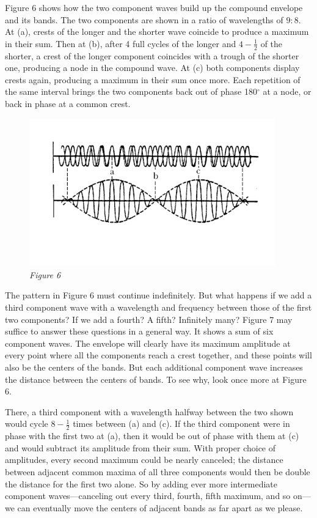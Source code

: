 Figure 6 shows how the two component waves build up the compound
envelope and its bands. The two components are shown in a ratio of
wavelengths of $9:8$. At (a), crests of the longer and the shorter wave
coincide to produce a maximum in their sum. Then at (b), after 4 full
cycles of the longer and $4-\frac{1}{2}$ of the shorter, a crest of the longer
component coincides with a trough of the shorter one, producing a node
in the compound wave. At (c) both components display crests again,
producing a maximum in their sum once more. Each repetition of the same
interval brings the two components back out of phase 180$^{\circ}$ at a node, or
back in phase at a common crest.

\begin{figure}[h] %
\centering
    \includegraphics[width=4.18333in,height=2.51667in]{images/08_debroglie/image039.png}
    \vspace{-3em}
    \caption*{\emph{Figure 6}}
\end{figure}

The pattern in Figure 6 must continue indefinitely. But what happens if
we add a third component wave with a wavelength and frequency between
those of the first two components? If we add a fourth? A fifth?
Infinitely many? Figure 7 may suffice to answer these questions in a
general way. It shows a sum of six component waves. The envelope will
clearly have its maximum amplitude at every point where all the
components reach a crest together, and these points will also be the
centers of the bands. But each additional component wave increases the
distance between the centers of bands. To see why, look once more at
Figure 6.

There, a third component with a wavelength halfway between the two shown
would cycle $8-\frac{1}{2}$ times between (a) and (c). If the third component were in
phase with the first two at (a), then it would be out of phase with them
at (c) and would subtract its amplitude from their sum. With proper
choice of amplitudes, every second maximum could be nearly canceled; the
distance between adjacent common maxima of all three components would
then be double the distance for the first two alone. So by adding ever
more intermediate component waves---canceling out every third, fourth,
fifth maximum, and so on---we can eventually move the centers of
adjacent bands as far apart as we please.

